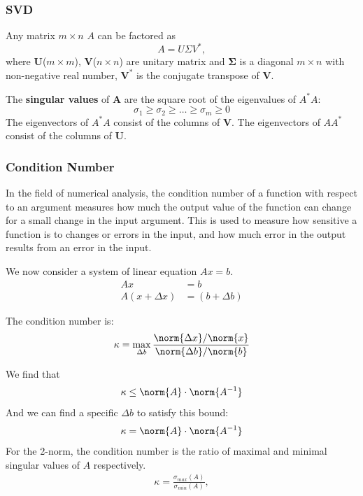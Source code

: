 \subsubsection{SVD}

Any matrix $m \times n$ $A$ can be factored as 
\begin{equation*}  
A = U \Sigma V^*,  
\end{equation*}
where \textbf{U}($m \times m$), \textbf{V}($n \times n$) are unitary matrix and $\mathbf{\Sigma}$ is a diagonal $m \times n$ with non-negative real number, $\mathbf{V^*}$ is the conjugate transpose of $\mathbf{V}$.

The \textbf{singular values} of \textbf{A} are the square root of the eigenvalues of $A^*A$:
\begin{equation*}  
  \sigma_1 \geq \sigma_2 \geq \dotso \geq \sigma_m \geq 0
\end{equation*}
The eigenvectors of $A^*A$ consist of the columns of \textbf{V}. The eigenvectors of $AA^*$ consist of the columns of \textbf{U}.


\subsubsection{Condition Number}
In the field of numerical analysis, the condition number of a function with respect to an argument measures how much the output value of the function can change for a small change in the input argument. This is used to measure how sensitive a function is to changes or errors in the input, and how much error in the output results from an error in the input. %

We now consider a system of linear equation $Ax = b$.
\begin{align*}  
Ax &= b \\
A(x + \Delta x) &= (b + \Delta b)
\end{align*}

The condition number is:
\begin{align*}  
\kappa = \operatorname*{max}_{\Delta b}\frac{\norm{\Delta x}/\norm{x}}{\norm{\Delta b}/\norm{b}}
\end{align*}

We find that
\begin{align*}  
\kappa \leq \norm{A} \cdot \norm{A^{-1}}
\end{align*}
And we can find a specific $\Delta b$ to satisfy this bound:
\begin{align*}  
\kappa = \norm{A} \cdot \norm{A^{-1}}
\end{align*}
For the 2-norm, the condition number is the ratio of maximal and minimal singular values of $A$ respectively.
\begin{align*}  
\kappa = \frac{\sigma_{max}{(A)}}{\sigma_{min}{(A)}},
\end{align*}

